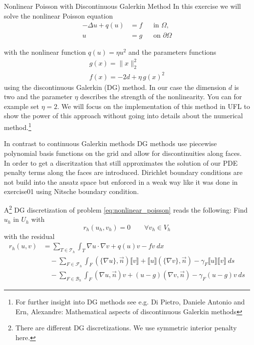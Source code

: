 \documentclass[12pt,a4paper]{article}
\newcommand\jump[1]{\llbracket #1 \rrbracket}
\newcommand\avg[1]{\{ #1 \}}
\begin{document}
\begin{Exercise}{Nonlinear Poisson with Discontinuous Galerkin Method}
  In this exercise we will solve the nonlinear Poisson equation
  \begin{equation}
    \begin{aligned}
      -\Delta u + q(u) &= f &&\text{in $\Omega$},\\
      u &= g &&\text{on $\partial\Omega$}
    \end{aligned}
    \label{eq:nonlinear_poisson}
  \end{equation}

  with the nonlinear function $q(u)=\eta u^2$ and the parameters functions
  \begin{align*}
    g(x) = \|x\|_2^2 \\
    f(x) = -2 d + \eta \, g(x)^2
  \end{align*}
  using the discontinuous Galerkin (DG) method. In our case the dimension $d$
  is two and the parameter $\eta$ describes the strength of the
  nonlinearity. You can for example set $\eta=2$. We will focus on the
  implementation of this method in UFL to show the power of this approach
  without going into details about the numerical method.\footnote{For further
    insight into DG methods see e.g. Di Pietro, Daniele Antonio and Ern,
    Alexandre: Mathematical aspects of discontinuous Galerkin methods}

  In contrast to continuous Galerkin methods DG methods use piecewise
  polynomial basis functions on the grid and allow for discontinuities along
  faces. In order to get a discritzation that still approximates the solution
  of our PDE penalty terms along the faces are introduced. Dirichlet boundary
  conditions are not build into the ansatz space but enforced in a weak way
  like it was done in exercise01 using Nitsche boundary condition.

  A\footnote{There are different DG discretizations. We use symmetric interior penalty here.} DG discretization of problem \eqref{eq:nonlinear_poisson} reads the
  following: Find $u_h$ in $U_h$ with
  \begin{equation*}
    r_h(u_h, v_h) = 0 \qquad \forall v_h \in V_h
  \end{equation*}
  with the residual
  \begin{equation}
    \label{eq:nonlinear_poisson_dg}
    \begin{aligned}
      r_h(u, v) & = \sum_{T\in\mathcal{T}_h}\int_T \nabla u\cdot\nabla v + q(u)v - fv\ dx\\
      &\quad - \sum_{F\in\mathcal{F}_h}\int_F (\avg{\nabla u}, \vec{n})\jump{v} + \jump{u}(\avg{\nabla v}, \vec{n}) - \gamma_F\jump{u}\jump{v}\ ds\\
      &\quad - \sum_{F\in\mathcal{B}_h}\int_F(\nabla u, \vec{n})v + (u-g)(\nabla v, \vec{n}) - \gamma_F(u-g)v\ ds
    \end{aligned}
  \end{equation}


\end{Exercise}
\end{document}
